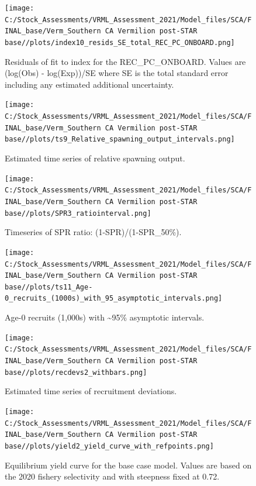 \documentclass[
  english,
  a4paper,
]{article}
\begin{document}
\begin{figure}
\centering
\texttt{[image: C:/Stock\_Assessments/VRML\_Assessment\_2021/Model\_files/SCA/FINAL\_base/Verm\_Southern CA Vermilion post-STAR base//plots/index10\_resids\_SE\_total\_REC\_PC\_ONBOARD.png]}
\caption{Residuals of fit to index for the REC\_PC\_ONBOARD. Values are (log(Obs) - log(Exp))/SE where SE is the total standard error including any estimated additional uncertainty.\label{fig:cpue-resid-REC-PC-ONBOARD}}
\end{figure}

\FloatBarrier

\FloatBarrier

\begin{figure}
\centering
\texttt{[image: C:/Stock\_Assessments/VRML\_Assessment\_2021/Model\_files/SCA/FINAL\_base/Verm\_Southern CA Vermilion post-STAR base//plots/ts9\_Relative\_spawning\_output\_intervals.png]}
\caption{Estimated time series of relative spawning output.\label{fig:depl}}
\end{figure}

\FloatBarrier

\begin{figure}
\centering
\texttt{[image: C:/Stock\_Assessments/VRML\_Assessment\_2021/Model\_files/SCA/FINAL\_base/Verm\_Southern CA Vermilion post-STAR base//plots/SPR3\_ratiointerval.png]}
\caption{Timeseries of SPR ratio: (1-SPR)/(1-SPR\_50\%).\label{fig:1-spr}}
\end{figure}

\begin{figure}
\centering
\texttt{[image: C:/Stock\_Assessments/VRML\_Assessment\_2021/Model\_files/SCA/FINAL\_base/Verm\_Southern CA Vermilion post-STAR base//plots/ts11\_Age-0\_recruits\_(1000s)\_with\_95\_asymptotic\_intervals.png]}
\caption{Age-0 recruits (1,000s) with \textasciitilde95\% asymptotic intervals.\label{fig:recruits}}
\end{figure}

\begin{figure}
\centering
\texttt{[image: C:/Stock\_Assessments/VRML\_Assessment\_2021/Model\_files/SCA/FINAL\_base/Verm\_Southern CA Vermilion post-STAR base//plots/recdevs2\_withbars.png]}
\caption{Estimated time series of recruitment deviations.\label{fig:recdevs}}
\end{figure}

\begin{figure}
\centering
\texttt{[image: C:/Stock\_Assessments/VRML\_Assessment\_2021/Model\_files/SCA/FINAL\_base/Verm\_Southern CA Vermilion post-STAR base//plots/yield2\_yield\_curve\_with\_refpoints.png]}
\caption{Equilibrium yield curve for the base case model. Values are based on the 2020
fishery selectivity and with steepness fixed at 0.72.\label{fig:yield2}}
\end{figure}
\end{document}
